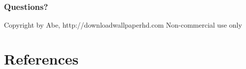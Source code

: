 \documentclass{beamer}
\begin{document}
        \begin{frame}
            \frametitle{Questions?}

                {Copyright by Abe, http://downloadwallpaperhd.com Non-commercial use only}

        \end{frame}

    \section{References}
\end{document}
